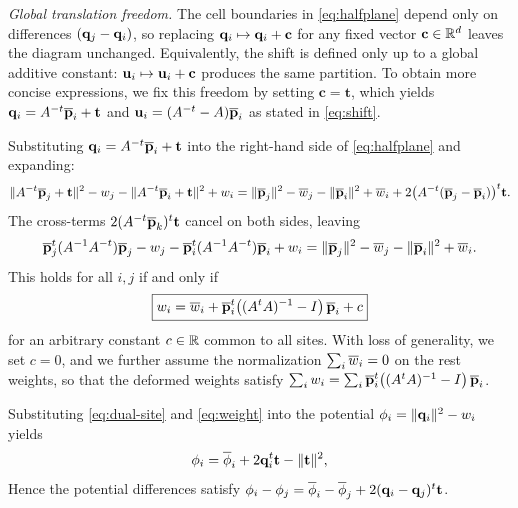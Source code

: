 \documentclass[11pt,a4paper]{article}
\begin{document}
\emph{Global translation freedom.} The cell boundaries in \eqref{eq:halfplane} depend only on differences $(\mathbf{q}_j - \mathbf{q}_i)$, so replacing $\mathbf{q}_i \mapsto \mathbf{q}_i + \mathbf{c}$ for any fixed vector $\mathbf{c} \in \mathbb{R}^{d}$ leaves the diagram unchanged. 
Equivalently, the shift is defined only up to a global additive constant: $\mathbf{u}_i \mapsto \mathbf{u}_i + \mathbf{c}$ produces the same partition. 
To obtain more concise expressions, we fix this freedom by setting $\mathbf{c} = \mathbf{t}$, which yields $\mathbf{q}_i = A^{-t}\overline{\mathbf{p}}_i + \mathbf{t}$ and $\mathbf{u}_i = (A^{-t} - A)\overline{\mathbf{p}}_i$ as stated in \eqref{eq:shift}.

Substituting $\mathbf{q}_i = A^{-t}\overline{\mathbf{p}}_i + \mathbf{t}$ into the right-hand side of \eqref{eq:halfplane} and expanding:
\begin{equation}
  \|A^{-t}\overline{\mathbf{p}}_j + \mathbf{t}\|^2 - w_j - \|A^{-t}\overline{\mathbf{p}}_i + \mathbf{t}\|^2 + w_i
  = \|\overline{\mathbf{p}}_j\|^2 - \overline{w}_j - \|\overline{\mathbf{p}}_i\|^2 + \overline{w}_i
    + 2\bigl(A^{-t}(\overline{\mathbf{p}}_j - \overline{\mathbf{p}}_i)\bigr)^t \mathbf{t}.
\end{equation}
The cross-terms $2(A^{-t}\overline{\mathbf{p}}_k)^t \mathbf{t}$ cancel on both sides, leaving
\begin{equation}
  \overline{\mathbf{p}}_j^t(A^{-1}A^{-t})\overline{\mathbf{p}}_j - w_j
  - \overline{\mathbf{p}}_i^t(A^{-1}A^{-t})\overline{\mathbf{p}}_i + w_i
  = \|\overline{\mathbf{p}}_j\|^2 - \overline{w}_j - \|\overline{\mathbf{p}}_i\|^2 + \overline{w}_i.
\end{equation}
This holds for all $i,j$ if and only if
\begin{equation}\label{eq:weight}
  \boxed{w_i = \overline{w}_i + \overline{\mathbf{p}}_i^t\!\left((A^tA)^{-1} - I\right)\overline{\mathbf{p}}_i + c}
\end{equation}
for an arbitrary constant $c \in \mathbb{R}$ common to all sites.
With loss of generality, we set $c = 0$, and we further assume the normalization $\sum_i \overline{w}_i = 0$ on the rest weights, so that the deformed weights satisfy $\sum_i w_i = \sum_i \overline{\mathbf{p}}_i^t\!\left((A^tA)^{-1} - I\right)\overline{\mathbf{p}}_i$.

Substituting \eqref{eq:dual-site} and \eqref{eq:weight} into the potential $\phi_i = \|\mathbf{q}_i\|^2 - w_i$ yields
\begin{equation}\label{eq:potential-affine}
  \phi_i = \overline{\phi}_i + 2\mathbf{q}_i^t \mathbf{t} - \|\mathbf{t}\|^2,
\end{equation}
Hence the potential differences satisfy $\phi_i - \phi_j = \overline{\phi}_i - \overline{\phi}_j + 2(\mathbf{q}_i - \mathbf{q}_j)^t\mathbf{t}$.
\end{document}

